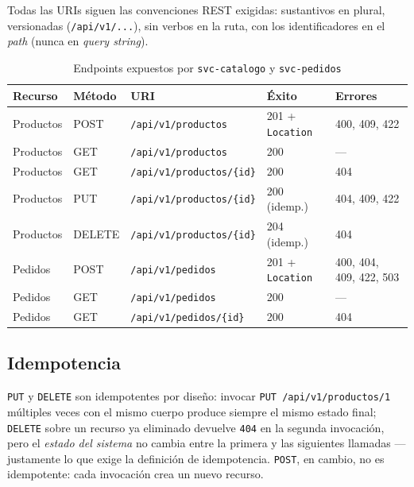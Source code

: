 \documentclass[11pt,a4paper]{article}
\begin{document}
Todas las URIs siguen las convenciones REST exigidas: sustantivos en plural,
versionadas (\texttt{/api/v1/...}), sin verbos en la ruta, con los
identificadores en el \emph{path} (nunca en \emph{query string}).

\begin{table}[h!]
    \centering
    \small
    \begin{tabular}{@{}lllll@{}}
        \toprule
        \textbf{Recurso} & \textbf{Método} & \textbf{URI} & \textbf{Éxito} & \textbf{Errores} \\
        \midrule
        Productos & POST   & \texttt{/api/v1/productos}      & 201 + \texttt{Location} & 400, 409, 422 \\
        Productos & GET    & \texttt{/api/v1/productos}      & 200 & --- \\
        Productos & GET    & \texttt{/api/v1/productos/\{id\}} & 200 & 404 \\
        Productos & PUT    & \texttt{/api/v1/productos/\{id\}} & 200 (idemp.) & 404, 409, 422 \\
        Productos & DELETE & \texttt{/api/v1/productos/\{id\}} & 204 (idemp.) & 404 \\
        Pedidos   & POST   & \texttt{/api/v1/pedidos}        & 201 + \texttt{Location} & 400, 404, 409, 422, 503 \\
        Pedidos   & GET    & \texttt{/api/v1/pedidos}        & 200 & --- \\
        Pedidos   & GET    & \texttt{/api/v1/pedidos/\{id\}} & 200 & 404 \\
        \bottomrule
    \end{tabular}
    \caption{Endpoints expuestos por \texttt{svc-catalogo} y \texttt{svc-pedidos}}
    \label{tab:endpoints}
\end{table}

\subsection{Idempotencia}

\texttt{PUT} y \texttt{DELETE} son idempotentes por diseño: invocar
\texttt{PUT /api/v1/productos/1} múltiples veces con el mismo cuerpo produce
siempre el mismo estado final; \texttt{DELETE} sobre un recurso ya eliminado
devuelve \texttt{404} en la segunda invocación, pero el \emph{estado del
sistema} no cambia entre la primera y las siguientes llamadas —justamente lo
que exige la definición de idempotencia. \texttt{POST}, en cambio, no es
idempotente: cada invocación crea un nuevo recurso.
\end{document}

